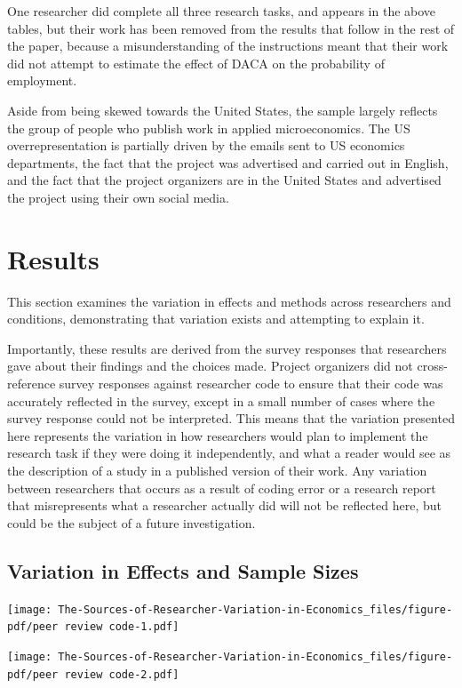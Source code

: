 \documentclass[
  letterpaper,
  DIV=11,
  numbers=noendperiod]{scrartcl}
\begin{document}
One researcher did complete all three research tasks, and appears in the
above tables, but their work has been removed from the results that
follow in the rest of the paper, because a misunderstanding of the
instructions meant that their work did not attempt to estimate the
effect of DACA on the probability of employment.

Aside from being skewed towards the United States, the sample largely
reflects the group of people who publish work in applied microeconomics.
The US overrepresentation is partially driven by the emails sent to US
economics departments, the fact that the project was advertised and
carried out in English, and the fact that the project organizers are in
the United States and advertised the project using their own social
media.

\section{Results}\label{results}

This section examines the variation in effects and methods across
researchers and conditions, demonstrating that variation exists and
attempting to explain it.

Importantly, these results are derived from the survey responses that
researchers gave about their findings and the choices made. Project
organizers did not cross-reference survey responses against researcher
code to ensure that their code was accurately reflected in the survey,
except in a small number of cases where the survey response could not be
interpreted. This means that the variation presented here represents the
variation in how researchers would plan to implement the research task
if they were doing it independently, and what a reader would see as the
description of a study in a published version of their work. Any
variation between researchers that occurs as a result of coding error or
a research report that misrepresents what a researcher actually did will
not be reflected here, but could be the subject of a future
investigation.

\subsection{Variation in Effects and Sample Sizes}\label{sec-variation}

\texttt{[image: The-Sources-of-Researcher-Variation-in-Economics\_files/figure-pdf/peer review code-1.pdf]}

\texttt{[image: The-Sources-of-Researcher-Variation-in-Economics\_files/figure-pdf/peer review code-2.pdf]}
\end{document}
